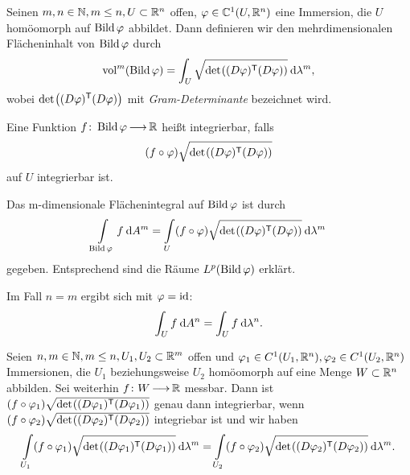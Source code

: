 \documentclass[skript.tex]{subfiles}
\begin{document}
\begin{defin}
	Seinen $m,n \in \mathbb{N}, m\leq n, U \subset {\mathbb{R}^n}$ offen, $\varphi \in \mathbb{C}^1(U,{\mathbb{R}^n})$ eine Immersion, die $U$ homöomorph auf $\operatorname{Bild} \varphi$ abbildet. Dann definieren wir den mehrdimensionalen Flächeninhalt von $\operatorname{Bild} \varphi$ durch
	\[
		\vol^m(\image \varphi) = \int_U \sqrt{\det \pr{(D\varphi)^\tp (D\varphi)}} \md \lambda^m ,
	\]
	wobei $\det \pr{(D\varphi)^\tp (D\varphi)}$ mit \textit{Gram-Determinante} bezeichnet wird.
	
	Eine Funktion $f\colon \operatorname{Bild} \varphi \kern -1pt \longrightarrow \kern -1pt \mathbb{R}$ heißt integrierbar, falls
	\[
		(f \circ \varphi) \sqrt{\det \pr{(D\varphi)^\tp (D\varphi)}}
	\]
	auf $U$ integrierbar ist.
	
	Das m-dimensionale Flächenintegral auf $\operatorname{Bild} \varphi$ ist durch
	\[
		\lint_{\image \varphi} f \md A^m = \lint_U (f\circ \varphi) \sqrt{\det \pr{(D\varphi)^\tp (D\varphi)}} \md \lambda^m
	\]
	gegeben. Entsprechend sind die Räume $L^p (\operatorname{Bild} \varphi)$ erklärt.
	
	Im Fall $n=m$ ergibt sich mit $\varphi = \mathrm{id}$:
	\[
		\int_U f \: \mathrm{d} A^n = \int_U f \: \mathrm{d} \lambda^n.
	\]
\end{defin}

\begin{lem}
	Seien $n,m \in \mathbb{N}, m\leq n, U_1, U_2 \subset \mathbb{R}^m$ offen und $\varphi_1 \in C^1(U_1, {\mathbb{R}^n}), \varphi_2 \in C^1(U_2, {\mathbb{R}^n})$ Immersionen, die $U_1$ beziehungsweise $U_2$ homöomorph auf eine Menge $W\subset {\mathbb{R}^n}$ abbilden. Sei weiterhin $f\colon W \kern -1pt \longrightarrow \kern -1pt \mathbb{R}$ messbar. Dann ist $(f\circ \varphi_1) \sqrt{\det \pr{(D\varphi_1)^\tp (D\varphi_1)}}$ genau dann integrierbar, wenn $(f \circ \varphi_2) \sqrt{\det \pr{(D\varphi_2)^\tp (D\varphi_2)}}$ integriebar ist und wir haben
	\[
		\lint_{U_1} (f \circ \varphi_1) \sqrt{\det \pr{(D\varphi_1)^\tp (D\varphi_1)}} \md \lambda^m = \lint_{U_2} (f\circ \varphi_2) \sqrt{\det \pr{(D\varphi_2)^\tp (D\varphi_2)}} \md \lambda^m.
	\]
\end{lem}
\end{document}
